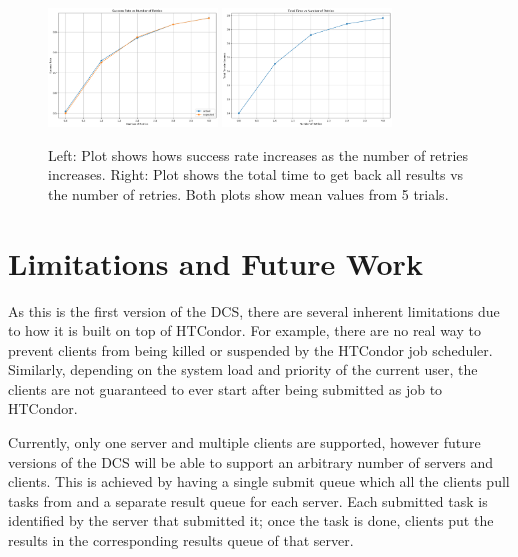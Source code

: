 \documentclass{article}
\begin{document}
\begin{figure}[t]
  \begin{center}
    \includegraphics[width=0.4\textwidth]{succ_rate_task_error_local.png}
    \includegraphics[width=0.4\textwidth]{timing_task_error_local.png}
    \caption{Left: Plot shows hows success rate increases as the number of retries increases. Right: Plot shows the total time to get back all results vs the number of retries. Both plots show mean values from 5 trials.}
    \label{fg:success_rate}
  \end{center}
\end{figure}

\section{Limitations and Future Work}

As this is the first version of the DCS, there are several inherent limitations due to how it is built on top of HTCondor. For example, there are no real way to prevent clients from being killed or suspended by the HTCondor job scheduler. Similarly, depending on the system load and priority of the current user, the clients are not guaranteed to ever start after being submitted as job to HTCondor.

Currently, only one server and multiple clients are supported, however future versions of the DCS will be able to support an arbitrary number of servers and clients. This is achieved by having a single submit queue which all the clients pull tasks from and a separate result queue for each server. Each submitted task is identified by the server that submitted it; once the task is done, clients put the results in the corresponding results queue of that server.
\end{document}
